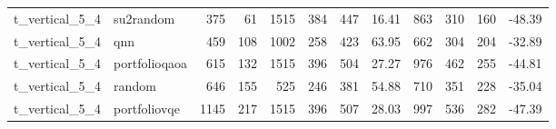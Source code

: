 \begin{longtable}{llrrrrrlrrrl}
t\_vertical\_5\_4 & su2random & 375 & 61 & 1515 & 384 & 447 & 16.41 & 863 & 310 & 160 & -48.39 \\
t\_vertical\_5\_4 & qnn & 459 & 108 & 1002 & 258 & 423 & 63.95 & 662 & 304 & 204 & -32.89 \\
t\_vertical\_5\_4 & portfolioqaoa & 615 & 132 & 1515 & 396 & 504 & 27.27 & 976 & 462 & 255 & -44.81 \\
t\_vertical\_5\_4 & random & 646 & 155 & 525 & 246 & 381 & 54.88 & 710 & 351 & 228 & -35.04 \\
t\_vertical\_5\_4 & portfoliovqe & 1145 & 217 & 1515 & 396 & 507 & 28.03 & 997 & 536 & 282 & -47.39 \\
\end{longtable}
